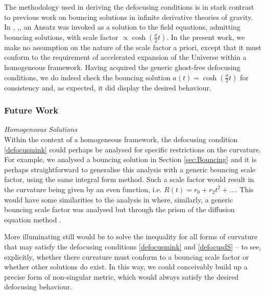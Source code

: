 The methodology used in deriving the defocusing conditions is in stark contrast to previous work on bouncing solutions in infinite derivative theories of gravity. In \cite{Biswas:2005qr}, \cite{Koshelev:2012qn},\cite{Koshelev:2013lfm}, an Ansatz was invoked as a solution to the field equations, admitting bouncing solutions, with scale factor $\propto \cosh(\frac{\sigma}{2} t)$. In the present work, we make no assumption on the nature of the scale factor a priori, except that it must conform to the requirement of accelerated expansion of the Universe  within a homogeneous framework. Having acquired the generic ghost-free defocusing conditions, we do indeed check the bouncing solution $a(t)=\cosh(\frac{\sigma}{2} t)$ for consistency and, as expected, it did display the desired behaviour.
%
\subsubsection*{Future Work}
\emph{Homogeneous Solutions}\\
 Within the context of a homogeneous framework, the defocusing condition \eqref{defocusmink} could perhaps be analysed for specific restrictions on the curvature. For example, we analysed a bouncing solution in Section \ref{sec:Bouncing} and it is perhaps straightforward to generalise this analysis with a generic bouncing scale factor, using the same integral form method. Such a scale factor would result in the curvature being given by an even function, i.e. $R(t)=r_0+r_2 t^2+...$. This would have some similarities to the analysis in \cite{Conroy:2014dja} where, similarly, a generic bouncing scale factor was analysed but through the prism of the diffusion equation method \cite{Calcagni:2007ru}.

More illuminating still would be to solve the inequality for all forms of curvature that may satisfy the defocusing conditions \eqref{defocusmink} and \eqref{defocusdS} -- to see, explicitly, whether there curvature must conform to a bouncing scale factor or whether other solutions do exist. In this way, we could conceivably build up a precise form of non-singular metric, which would always satisfy the desired defocusing behaviour.  

